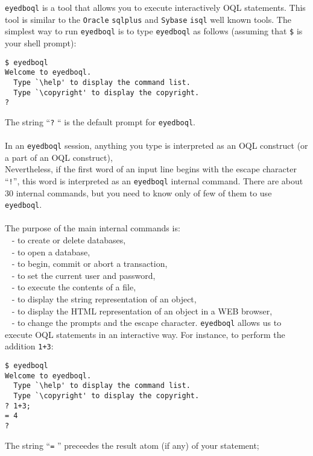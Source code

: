 \texttt{eyedboql} is a tool that allows you to execute interactively OQL 
statements.
This tool is similar to the \texttt{Oracle} \texttt{sqlplus} and \texttt{Sybase}
\texttt{isql} well known tools.
The simplest way to run \texttt{eyedboql} is to type \texttt{eyedboql}
as follows (assuming that \texttt{\$} is your shell prompt):
\verbsize
\begin{verbatim}
$ eyedboql
Welcome to eyedboql.
  Type `\help' to display the command list.
  Type `\copyright' to display the copyright.
?
\end{verbatim}
\normalsize
The string ``\texttt{?} `` is the default prompt for \texttt{eyedboql}.
\\
\\
In an \texttt{eyedboql} session, anything you type is interpreted as an
OQL construct (or a part of an OQL construct),
\\
Nevertheless, if the first word of an input line begins with the escape
character ``\texttt{!}'', this word is interpreted as an \texttt{eyedboql}
internal command.
There are about 30 internal commands, but you need to know only of few of them
to use \texttt{eyedboql}.\\
\\
The purpose of the main internal commands is:\\
\mbox{ } - to create or delete databases,\\
\mbox{ } - to open a database,\\
\mbox{ } - to begin, commit or abort a transaction,\\
\mbox{ } - to set the current user and password,\\
\mbox{ } - to execute the contents of a file,\\
\mbox{ } - to display the string representation of an object,\\
\mbox{ } - to display the HTML representation of an object in a WEB browser,\\
\mbox{ } - to change the prompts and the escape character.
\texttt{eyedboql} allows us to execute OQL statements in an interactive way.
For instance, to perform the addition \texttt{1+3}:
\verbsize
\begin{verbatim}
$ eyedboql
Welcome to eyedboql.
  Type `\help' to display the command list.
  Type `\copyright' to display the copyright.
? 1+3;
= 4
?
\end{verbatim}
\normalsize
The string ``\texttt{=} '' preceedes the result atom (if any) of your statement;

